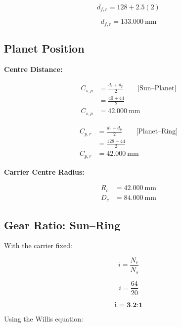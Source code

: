 \documentclass{article}
\begin{document}
\begin{equation}
d_{f,r} = 128 + 2.5(2)
\end{equation}

\begin{equation}
d_{f,r} = 133.000\ \mathrm{mm}
\end{equation}


\newpage

\subsection{\textbf{Planet Position}}

\textbf{Centre Distance:}

\begin{align}
C_{s,p} &= \frac{d_s+d_p}{2}
\qquad \text{[Sun--Planet]}\\
&= \frac{40+44}{2}\\
C_{s,p} &= 42.000\ \mathrm{mm}
\end{align}

\begin{align}
C_{p,r} &= \frac{d_r-d_p}{2}
\qquad \text{[Planet--Ring]}\\
&= \frac{128-44}{2}\\
C_{p,r} &= 42.000\ \mathrm{mm}
\end{align}

\textbf{Carrier Centre Radius:}

\begin{align}
R_c &= 42.000\ \mathrm{mm}\\
D_c &= 84.000\ \mathrm{mm}
\end{align}


\subsection{\textbf{Gear Ratio: Sun--Ring}}

With the carrier fixed:

\begin{equation}
i = \frac{N_r}{N_s}
\end{equation}

\begin{equation}
i = \frac{64}{20}
\end{equation}

\begin{equation}
\textbf{i = 3.2:1}
\end{equation}

Using the Willis equation:
\end{document}
